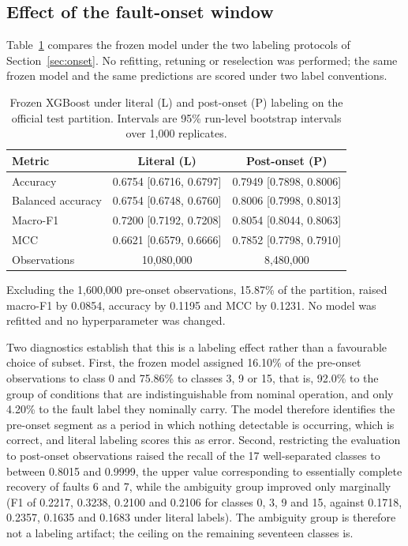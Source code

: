 \documentclass[10pt,twocolumn,a4paper]{article}
\begin{document}
\subsection{Effect of the fault-onset window}
\label{sec:onseteffect}

Table~\ref{tab:onset} compares the frozen model under the two labeling
protocols of Section~\ref{sec:onset}. No refitting, retuning or reselection was
performed; the same frozen model and the same predictions are scored under two
label conventions.

\begin{table}[t]
\centering
\caption{Frozen XGBoost under literal (L) and post-onset (P) labeling on the
official test partition. Intervals are 95\% run-level bootstrap intervals over
1,000 replicates.}
\label{tab:onset}
\small
\begin{tabular}{lcc}
\toprule
Metric & Literal (L) & Post-onset (P)\\
\midrule
Accuracy          & 0.6754 [0.6716, 0.6797] & 0.7949 [0.7898, 0.8006]\\
Balanced accuracy & 0.6754 [0.6748, 0.6760] & 0.8006 [0.7998, 0.8013]\\
Macro-F1          & 0.7200 [0.7192, 0.7208] & 0.8054 [0.8044, 0.8063]\\
MCC               & 0.6621 [0.6579, 0.6666] & 0.7852 [0.7798, 0.7910]\\
Observations      & 10,080,000 & 8,480,000\\
\bottomrule
\end{tabular}
\end{table}

Excluding the 1,600,000 pre-onset observations, 15.87\% of the partition,
raised macro-F1 by 0.0854, accuracy by 0.1195 and MCC by 0.1231. No model was
refitted and no hyperparameter was changed.

Two diagnostics establish that this is a labeling effect rather than a
favourable choice of subset. First, the frozen model assigned 16.10\% of the
pre-onset observations to class 0 and 75.86\% to classes 3, 9 or 15, that is,
92.0\% to the group of conditions that are indistinguishable from nominal
operation, and only 4.20\% to the fault label they nominally carry. The model
therefore identifies the pre-onset segment as a period in which nothing
detectable is occurring, which is correct, and literal labeling scores this as
error. Second, restricting the evaluation to post-onset observations raised the
recall of the 17 well-separated classes to between 0.8015 and 0.9999, the upper
value corresponding to essentially complete recovery of faults 6 and 7, while
the ambiguity group improved only marginally (F1 of 0.2217, 0.3238, 0.2100 and
0.2106 for classes 0, 3, 9 and 15, against 0.1718, 0.2357, 0.1635 and 0.1683
under literal labels). The ambiguity group is therefore not a labeling
artifact; the ceiling on the remaining seventeen classes is.
\end{document}
